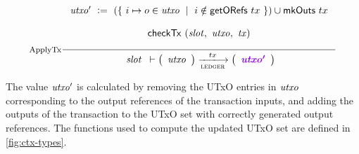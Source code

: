   \begin{equation}
  \label{fig:ledger-rule}
    \inference[ApplyTx]
    {
    \var{utxo'}~\leteq~(\{~i\mapsto o \in \var{utxo} ~\mid~ i \notin \fun{getORefs}~{tx}~\}) \cup \fun{mkOuts}~{tx}
    \\ ~ \\
    \fun{checkTx}~(\var{slot},~\var{utxo},~\var{tx})
    \\ ~ \\
    }
    {
    \begin{array}{l}
      \var{slot}\\
    \end{array}
      \vdash
      \left(
      \begin{array}{r}
        \var{utxo} \\
      \end{array}
      \right)
      \trans{ledger}{tx}
      \left(
      \begin{array}{r}
        \varUpdate{\var{utxo'}}  \\
      \end{array}
      \right) \\
    }
  \end{equation}

The value $\mathit{utxo'}$ is calculated by removing the UTxO entries in $\mathit{utxo}$
corresponding to the output references of the transaction inputs, and adding the outputs of the
transaction to the UTxO set with correctly generated output references.
The functions used to compute the updated UTxO set are defined in \ref{fig:ctx-types}.
